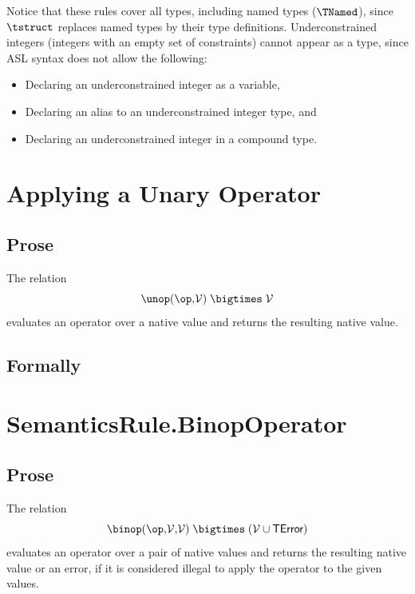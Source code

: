 \documentclass{book}
\newcommand\eqdef[0]{:=}
\newcommand\vals[0]{\mathcal{V}}
\newcommand\nvint[0]{\texttt{Int}}
\newcommand\nvbool[0]{\texttt{Bool}}
\newcommand\nvreal[0]{\texttt{Real}}
\newcommand\nvbitvector[0]{\texttt{Bitvector}}
\newcommand\evalarrow[0]{\stackrel{\mathsf{asl}}{\rightsquigarrow}}
\newcommand\aslrel[0]{\bigtimes}
\newcommand\aslsep[0]{\mathbf{,}}
\newcommand\TError[0]{\textsf{TError}}
\newcommand\bits[0]{\texttt{bits}}
\begin{document}
\begin{emptyformal}
Notice that these rules cover all types, including named types ($\TNamed$),
since $\tstruct$ replaces named types by their type definitions.
%
Underconstrained integers (integers with an empty set of constraints)
cannot appear as a type, since ASL syntax does not allow the following:
\begin{itemize}
\item Declaring an underconstrained integer as a variable,
\item Declaring an alias to an underconstrained integer type, and
\item Declaring an underconstrained integer in a compound type.
\end{itemize}
\end{emptyformal}

\section{Applying a Unary Operator \label{sec:UnaryOperator}}
\subsection{Prose}
The relation
\[
  \unop(\op \aslsep \vals) \;\aslrel\; \vals
\]
evaluates an operator over a native value and returns the resulting
native value.

\begin{emptyformal}
\subsection{Formally}
\end{emptyformal}

\section{SemanticsRule.BinopOperator \label{sec:SemanticsRule.BinopOperator}}
\subsection{Prose}
The relation
\[
  \binop(\op \aslsep \vals \aslsep \vals) \;\aslrel\; (\vals \cup \TError)
\]
evaluates an operator over a pair of native values and returns the resulting
native value or an error, if it is considered illegal to apply the operator
to the given values.
\end{document}
